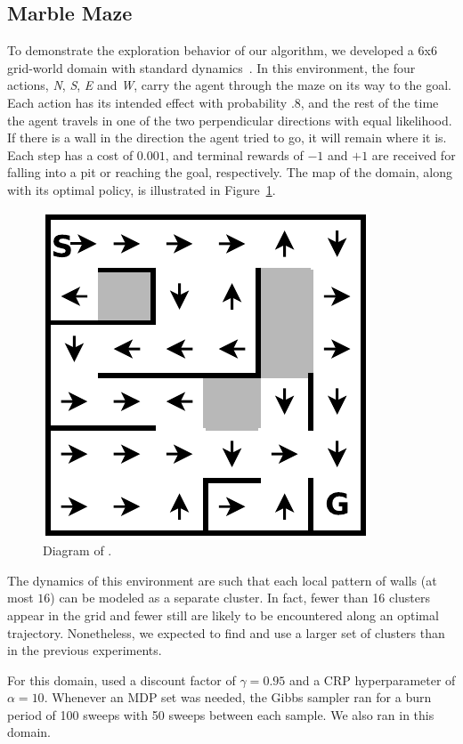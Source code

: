 \subsection{Marble Maze}


To demonstrate the exploration behavior of our algorithm, we developed a
6x6 grid-world domain with standard dynamics~\cite{russell94}.  In this environment, the four actions,
\emph{N}, \emph{S}, \emph{E} and \emph{W}, carry the
agent through the maze on its way to the goal.  Each action has its
intended effect with probability .8, and the rest of the time the
agent travels in one of the two perpendicular directions with
equal likelihood.  If there is a wall in the direction the agent tried
to go, it will remain where it is.  Each step has a cost of $0.001$, and
terminal rewards of $-1$ and $+1$ are received for falling into a pit or
reaching the goal, respectively.  The map of the domain, along with
its optimal policy, is illustrated in Figure~\ref{f:marble}.

\begin{figure}[t]
\begin{center}
\includegraphics[width=0.6\linewidth]{figures/6x6_maze}
\caption{Diagram of .}
\label{f:marble}
\end{center}
\end{figure}

The dynamics of this environment are such that each local pattern of
walls (at most $16$) can be modeled as a separate cluster.  In fact,
fewer than 16 clusters appear in the grid and fewer still are likely
to be encountered along an optimal trajectory.  Nonetheless, we
expected  to find and use a larger set of clusters than in the
previous experiments.

For this domain,  used a discount factor of $\gamma=0.95$ and a
CRP hyperparameter of $\alpha=10$.  Whenever an MDP set was needed,
the Gibbs sampler ran for a burn period of 100 sweeps with 50 sweeps
between each sample.  We also ran  in this domain.

